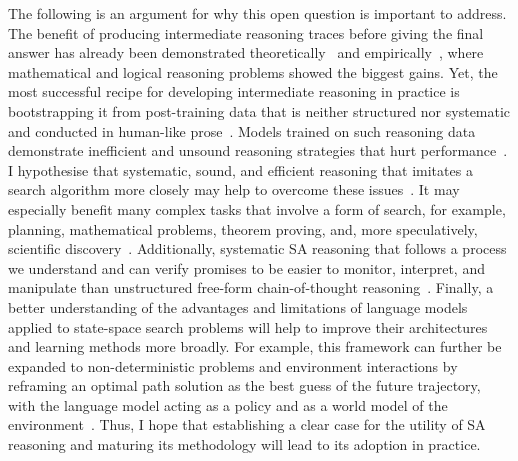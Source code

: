 The following is an argument for why this open question is important to address.
The benefit of producing intermediate reasoning traces before giving the final answer has already been demonstrated theoretically~\citep{merrillExpressivePowerTransformers2024,liChainThoughtEmpowers2024} and empirically~\citep{spragueToCoTorNot2025,weiChainofThoughtPromptingElicits2023,nyeShowYourWork2021}, where mathematical and logical reasoning problems showed the biggest gains.
Yet, the most successful recipe for developing intermediate reasoning in practice is bootstrapping it from post-training data that is neither structured nor systematic and conducted in human-like prose~\citep{deepseek-aiDeepSeekR1IncentivizingReasoning2025,guhaOpenThoughtsDataRecipes2025,lambertTulu3Pushing2025}.
Models trained on such reasoning data demonstrate inefficient and unsound reasoning strategies that hurt performance~\citep{chenNOTThinkThat2025,wangThoughtsAreAll,arcuschinChainofThoughtReasoningWild,pipisWaitWaitWait2026}.
I hypothesise that systematic, sound, and efficient reasoning that imitates a search algorithm more closely may help to overcome these issues~\citep{lehnertBetterPlanningTransformers2024,gandhiStreamSearchSoS2024,kimASTROTeachingLanguage2025,gandhiFourHabitsHighly2025}.
It may especially benefit many complex tasks that involve a form of search, for example, planning, mathematical problems, theorem proving, and, more speculatively, scientific discovery~\citep{newell1972human,langleyScientificDiscovery1987}.
Additionally, systematic SA reasoning that follows a process we understand and can verify promises to be easier to monitor, interpret, and manipulate than unstructured free-form chain-of-thought reasoning~\citep{arcuschinChainofThoughtReasoningWild}.
Finally, a better understanding of the advantages and limitations of language models applied to state-space search problems will help to improve their architectures and learning methods more broadly.
For example, this framework can further be expanded to non-deterministic problems and environment interactions by reframing an optimal path solution as the best guess of the future trajectory, with the language model acting as a policy and as a world model of the environment~\citep{haoReasoningLanguageModel2023,haWorldModels2018,micheliTransformersAreSampleEfficient2023}.
Thus, I hope that establishing a clear case for the utility of SA reasoning and maturing its methodology will lead to its adoption in practice.

